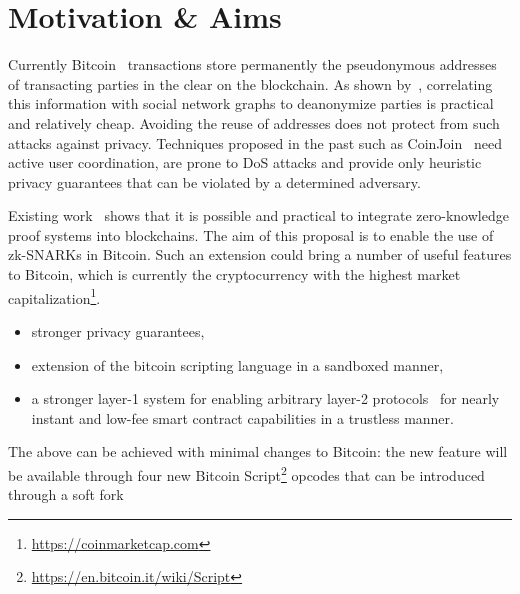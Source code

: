 \section{Motivation \& Aims}
  Currently Bitcoin~\cite{bitcoin} transactions store permanently the
  pseudonymous addresses of transacting parties in the clear on the blockchain.
  As shown by~\cite{DBLP:conf/fc/AndroulakiKRSC13}, correlating this information
  with social network graphs to deanonymize parties is practical and relatively
  cheap. Avoiding the reuse of addresses does not protect from such attacks
  against privacy. Techniques proposed in the past such as
  CoinJoin~\cite{DBLP:conf/trustcom/MaurerNF17} need active user coordination,
  are prone to DoS attacks and provide only heuristic privacy guarantees that
  can be violated by a determined adversary.

  Existing work~\cite{DBLP:conf/sp/Ben-SassonCG0MTV14,zcash-protocol,kachina}
  shows that it is possible and practical to integrate zero-knowledge proof
  systems into blockchains. The aim of this proposal is to enable the use of
  zk-SNARKs in Bitcoin. Such an extension could bring a number of useful
  features to Bitcoin, which is currently the cryptocurrency with the highest
  market capitalization\footnote{\url{https://coinmarketcap.com}}.
  \begin{itemize}
    \item stronger privacy guarantees,
    \item extension of the bitcoin scripting language in a sandboxed manner,
    \item a stronger layer-1 system for enabling arbitrary layer-2
    protocols~\cite{DBLP:conf/sss/DeckerW15,lightning,perun,DBLP:conf/systor/LindNEKPS18,sprites}
    for nearly instant and low-fee smart contract capabilities in a trustless
    manner.
  \end{itemize}
  The above can be achieved with minimal changes to Bitcoin: the new feature
  will be available through four new Bitcoin
  Script\footnote{\url{https://en.bitcoin.it/wiki/Script}} opcodes that can be
  introduced through a soft fork~\cite{DBLP:conf/fc/ZamyatinSJSWK18}
